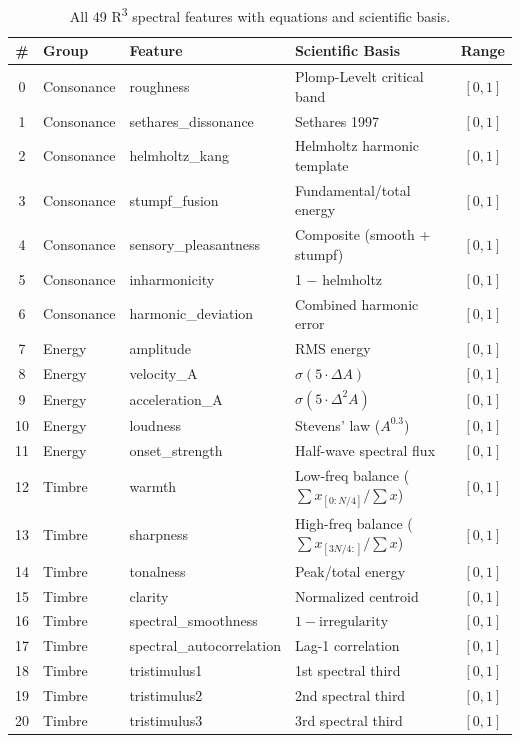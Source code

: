 \documentclass[10pt,twocolumn]{article}
\newcommand{\Rtri}{R\textsuperscript{3}}
\begin{document}
\begin{table}[H]
\centering
\caption{All 49 \Rtri{} spectral features with equations and scientific basis.}
\small
\begin{tabular}{@{}clllc@{}}
\toprule
\textbf{\#} & \textbf{Group} & \textbf{Feature} & \textbf{Scientific Basis} & \textbf{Range} \\
\midrule
0  & Consonance & roughness & Plomp-Levelt critical band & $[0,1]$ \\
1  & Consonance & sethares\_dissonance & Sethares 1997 & $[0,1]$ \\
2  & Consonance & helmholtz\_kang & Helmholtz harmonic template & $[0,1]$ \\
3  & Consonance & stumpf\_fusion & Fundamental/total energy & $[0,1]$ \\
4  & Consonance & sensory\_pleasantness & Composite (smooth + stumpf) & $[0,1]$ \\
5  & Consonance & inharmonicity & 1 $-$ helmholtz & $[0,1]$ \\
6  & Consonance & harmonic\_deviation & Combined harmonic error & $[0,1]$ \\
\midrule
7  & Energy & amplitude & RMS energy & $[0,1]$ \\
8  & Energy & velocity\_A & $\sigma(5 \cdot \Delta A)$ & $[0,1]$ \\
9  & Energy & acceleration\_A & $\sigma(5 \cdot \Delta^2 A)$ & $[0,1]$ \\
10 & Energy & loudness & Stevens' law ($A^{0.3}$) & $[0,1]$ \\
11 & Energy & onset\_strength & Half-wave spectral flux & $[0,1]$ \\
\midrule
12 & Timbre & warmth & Low-freq balance ($\sum x_{[0:N/4]}/\sum x$) & $[0,1]$ \\
13 & Timbre & sharpness & High-freq balance ($\sum x_{[3N/4:]}/\sum x$) & $[0,1]$ \\
14 & Timbre & tonalness & Peak/total energy & $[0,1]$ \\
15 & Timbre & clarity & Normalized centroid & $[0,1]$ \\
16 & Timbre & spectral\_smoothness & $1 - \text{irregularity}$ & $[0,1]$ \\
17 & Timbre & spectral\_autocorrelation & Lag-1 correlation & $[0,1]$ \\
18 & Timbre & tristimulus1 & 1st spectral third & $[0,1]$ \\
19 & Timbre & tristimulus2 & 2nd spectral third & $[0,1]$ \\
20 & Timbre & tristimulus3 & 3rd spectral third & $[0,1]$ \\

\end{tabular}
\end{table}
\end{document}
